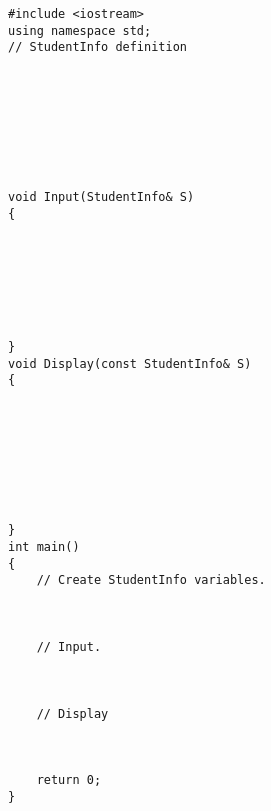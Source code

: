 \documentclass[12pt,a4paper]{article}
\begin{document}
\begin{lstlisting}
#include <iostream>
using namespace std;
// StudentInfo definition








void Input(StudentInfo& S)
{







}
void Display(const StudentInfo& S)
{








}
int main()
{
	// Create StudentInfo variables.



	// Input.



	// Display



	return 0;
}
\end{lstlisting}
\end{document}
